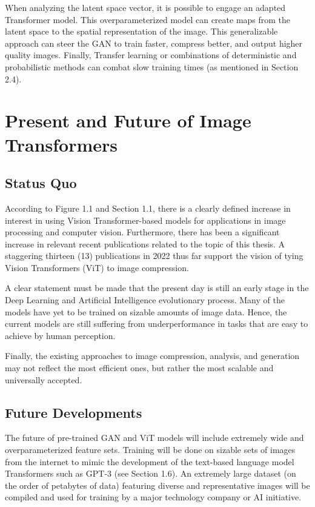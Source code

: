 When analyzing the latent space vector, it is possible to engage an adapted Transformer model. This overparameterized model
can create maps from the latent space to the spatial representation of the image. 
This generalizable approach can steer the GAN to train faster, compress better, and output higher quality images.
Finally, Transfer learning or combinations of deterministic and probabilistic methods can combat slow training times 
(as mentioned in Section 2.4).


\section{Present and Future of Image Transformers}

\subsection{Status Quo}
According to Figure 1.1 and Section 1.1, there is a clearly defined increase in interest in using Vision Transformer-based 
models for applications in image processing and computer vision.
Furthermore, there has been a significant increase in relevant recent publications related to the topic of this thesis.
A staggering thirteen (13) publications in 2022 thus far support the vision of tying 
Vision Transformers (ViT) to image compression. \citep{arxiv13}


A clear statement must be made that the present day is still an early stage in the Deep Learning and Artificial Intelligence 
evolutionary process. Many of the models have yet to be trained on sizable amounts of image data.
Hence, the current models are still suffering from underperformance in tasks that are easy to achieve by human perception.

Finally, the existing approaches to image compression, analysis, and generation may not reflect the most efficient ones, but 
rather the most scalable and universally accepted. \citep{Principles}

\subsection{Future Developments}

The future of pre-trained GAN and ViT models will include extremely wide and overparameterized feature sets.
Training will be done on sizable sets of images from the internet to mimic the development of 
the text-based language model Transformers such as GPT-3 (see Section 1.6). 
An extremely large dataset (on the order of petabytes of data) featuring diverse and 
representative images will be compiled and used for training by a major technology company or AI initiative.


